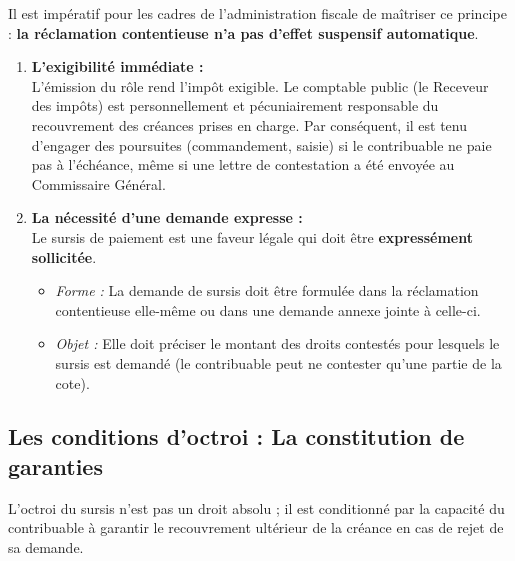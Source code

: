 \documentclass[Cours_contentieuxTF2026.tex]{subfiles}
\begin{document}
Il est impératif pour les cadres de l'administration fiscale de maîtriser ce principe : \textbf{la réclamation contentieuse n'a pas d'effet suspensif automatique}.

\begin{enumerate}
	\item \textbf{L'exigibilité immédiate :} \\
	L'émission du rôle rend l'impôt exigible. Le comptable public (le Receveur des impôts) est personnellement et pécuniairement responsable du recouvrement des créances prises en charge. Par conséquent, il est tenu d'engager des poursuites (commandement, saisie) si le contribuable ne paie pas à l'échéance, même si une lettre de contestation a été envoyée au Commissaire Général.
	
	\item \textbf{La nécessité d'une demande expresse :} \\
	Le sursis de paiement est une faveur légale qui doit être \textbf{expressément sollicitée}.
	\begin{itemize}
		\item \textit{Forme :} La demande de sursis doit être formulée dans la réclamation contentieuse elle-même ou dans une demande annexe jointe à celle-ci.
		\item \textit{Objet :} Elle doit préciser le montant des droits contestés pour lesquels le sursis est demandé (le contribuable peut ne contester qu'une partie de la cote).
	\end{itemize}
\end{enumerate}

\subsection{Les conditions d'octroi : La constitution de garanties}

L'octroi du sursis n'est pas un droit absolu ; il est conditionné par la capacité du contribuable à garantir le recouvrement ultérieur de la créance en cas de rejet de sa demande.
\end{document}
